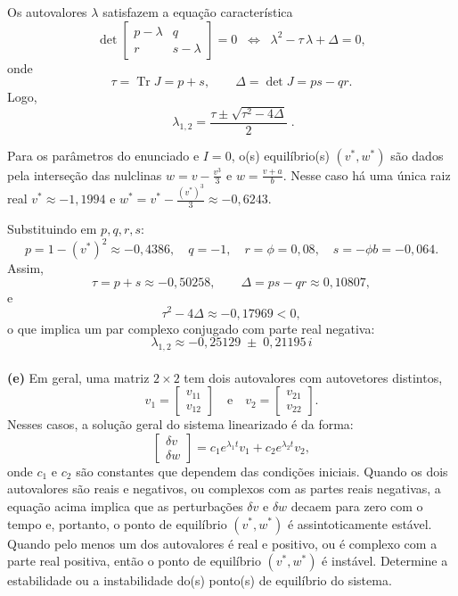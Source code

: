 \documentclass[english,11pt,a4paper]{article}
\begin{document}
	\noindent Os autovalores \(\lambda\) satisfazem a equação característica
	\[
	\det\!\begin{bmatrix}
		p-\lambda & q\\
		r & s-\lambda
	\end{bmatrix}=0
	\;\;\Longleftrightarrow\;\;
	\lambda^2 - \tau\,\lambda + \Delta = 0,
	\]
	onde
	\[
	\tau=\operatorname{Tr}J = p+s, 
	\qquad 
	\Delta=\det J = ps - qr .
	\]
	Logo,
	\[
	\boxed{\;\lambda_{1,2}=\frac{\tau \pm \sqrt{\tau^{2}-4\Delta}}{2}\; }.
	\]
	
	\noindent Para os parâmetros do enunciado e \(I=0\), o(s) equilíbrio(s) \((v^\ast,w^\ast)\) são dados pela interseção das nulclinas
	\(
	w = v - \frac{v^3}{3}
	\)
	e
	\(
	w = \frac{v+a}{b}
	\).
	Nesse caso há uma única raiz real \(v^\ast \approx -1{,}1994\) e 
	\(
	w^\ast = v^\ast - \frac{(v^\ast)^3}{3} \approx -0{,}6243.
	\)
	
	\noindent Substituindo em \(p,q,r,s\):
	\[
	p = 1-(v^\ast)^2 \approx -0{,}4386,\quad
	q=-1,\quad
	r=\phi=0{,}08,\quad
	s=-\phi b=-0{,}064.
	\]
	Assim,
	\[
	\tau=p+s \approx -0{,}50258,
	\qquad
	\Delta=ps-qr \approx 0{,}10807,
	\]
	e
	\[
	\tau^2-4\Delta \approx -0{,}17969 < 0,
	\]
	o que implica um par complexo conjugado com parte real negativa:
	\[
	\boxed{\;
		\lambda_{1,2} \approx -0{,}25129 \;\pm\; 0{,}21195\,i
		\;}
	\]\\
	
	
	\noindent\textbf{(e)} Em geral, uma matriz $2 \times 2$ tem dois autovalores com autovetores distintos,
	\[
	v_1 =
	\begin{bmatrix}
		v_{11} \\
		v_{12}
	\end{bmatrix}
	\quad \text{e} \quad
	v_2 =
	\begin{bmatrix}
		v_{21} \\
		v_{22}
	\end{bmatrix}.
	\]
	Nesses casos, a solução geral do sistema linearizado é da forma:
	\[
	\begin{bmatrix}
		\delta v \\
		\delta w
	\end{bmatrix}
	= c_1 e^{\lambda_1 t} v_1 + c_2 e^{\lambda_2 t} v_2,
	\]
	onde $c_1$ e $c_2$ são constantes que dependem das condições iniciais. Quando os dois autovalores são reais e negativos, ou complexos com as partes reais negativas, a equação acima implica que as perturbações $\delta v$ e $\delta w$ decaem para zero com o tempo e, portanto, o ponto de equilíbrio $(v^*, w^*)$ é assintoticamente estável. Quando pelo menos um dos autovalores é real e positivo, ou é complexo com a parte real positiva, então o ponto de equilíbrio $(v^*, w^*)$ é instável. Determine a estabilidade ou a instabilidade do(s) ponto(s) de equilíbrio do sistema.
	
\end{document}
